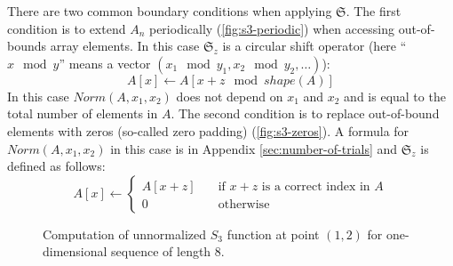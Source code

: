 \documentclass[reprint,amsmath,amssymb,aps,pre,showkeys,showpacs]{revtex4-1}
\begin{document}
There are two common boundary conditions when applying $\mathfrak{S}$. The
first condition is to extend $A_n$ periodically (\cref{fig:s3-periodic}) when
accessing out-of-bounds array elements. In this case $\mathfrak{S}_z$ is a
circular shift operator (here ``$x \mod y$'' means a vector
$(x_1 \mod y_1, x_2 \mod y_2, \dots)$):
\begin{equation}
  A[x] \leftarrow A[x+z \mod shape(A)]
\end{equation}
In this case $Norm(A, x_1, x_2)$ does not depend on $x_1$ and $x_2$ and
is equal to the total number of elements in $A$. The second condition is to
replace out-of-bound elements with zeros (so-called zero padding)
(\cref{fig:s3-zeros}). A formula for $Norm(A, x_1, x_2)$ in this case is in Appendix
\ref{sec:number-of-trials} and $\mathfrak{S}_z$ is defined as follows:
\begin{equation}
  A[x] \leftarrow \left\{
  \begin{array}{ll}
    A[x+z] & \quad \text{if $x+z$ is a correct index in $A$} \\
    0 & \quad \text{otherwise}
  \end{array}
  \right.
\end{equation}
\begin{figure}[tp]
  \centering
  \hfill
  \caption[]{Computation of unnormalized $S_3$ function at point $(1, 2)$ for
    one-dimensional sequence of length 8.}
  \label{fig:s3-computation}
\end{figure}
\end{document}
